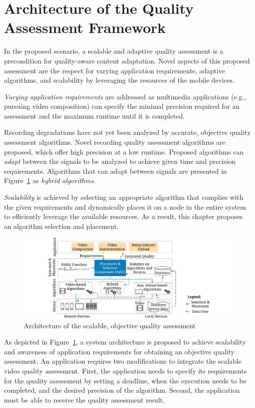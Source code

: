 \section{Architecture of the Quality Assessment Framework}
\label{sec:553_Architecture}
In the proposed scenario, a scalable and adaptive quality assessment is a precondition for quality-aware content adaptation.
Novel aspects of this proposed assessment are the respect for varying application requirements, adaptive algorithms, and scalability by leveraging the resources of the mobile devices.

\emph{Varying application requirements} are addressed as multimedia applications (e.g., pursuing video composition) can specify the minimal precision required for an assessment and the maximum runtime until it is completed.

Recording degradations have not yet been analyzed by accurate, objective quality assessment algorithms.
Novel recording quality assessment algorithms are proposed, which offer high precision at a low runtime.
Proposed algorithms can \emph{adapt} between the signals to be analyzed to achieve given time and precision requirements.
Algorithms that can adapt between signals are presented in Figure~\ref{fig:553_architecture} as \emph{hybrid algorithms}.

\emph{Scalability} is achieved by selecting an appropriate algorithm that complies with the given requirements and dynamically places it on a node in the entire system to efficiently leverage the available resources.
As a result, this chapter proposes an algorithm selection and placement.

\begin{figure}[!htb]
\centering
\includegraphics[width=\linewidth]{./gfx/550_QA/VIDEO_QUALITY_ARCHITECTURE}
\caption{Architecture of the scalable, objective quality assessment}
\label{fig:553_architecture}
\end{figure}
As depicted in Figure~\ref{fig:553_architecture}, a system architecture is proposed to achieve scalability and awareness of application requirements for obtaining an objective quality assessment.
An application requires two modifications to integrate the scalable video quality assessment.
First, the application needs to specify its requirements for the quality assessment by setting a deadline, when the execution needs to be completed, and the desired precision of the algorithm. 
Second, the application must be able to receive the quality assessment result.


